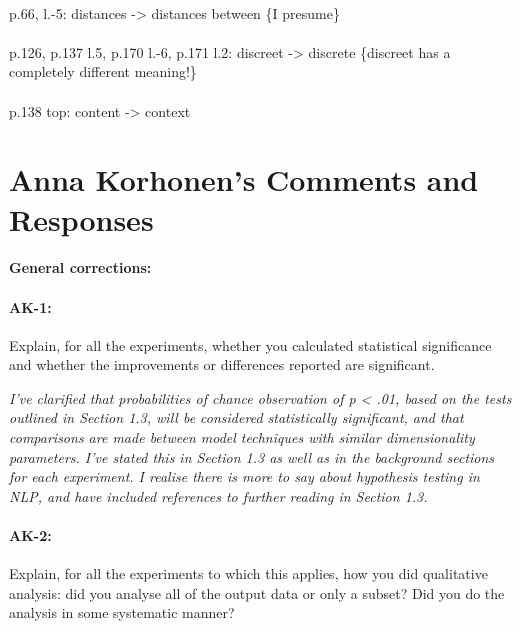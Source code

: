 \documentclass[11pt,a4paper]{article}
\newcommand{\res}[1]{\vspace{0.25cm} \begin{adjustwidth}{1cm}{}\emph{#1}\end{adjustwidth}}
\begin{document}
\paragraph{} p.66, l.-5: distances -> distances between \{I presume\}

\paragraph{} p.126,   p.137 l.5,   p.170 l.-6,   p.171 l.2: discreet -> discrete \{discreet has a completely different meaning!\}

\paragraph{} p.138 top: content -> context 


\section{Anna Korhonen's Comments and Responses}

\paragraph{General corrections:}

\paragraph{AK-1:} Explain, for all the experiments, whether you calculated statistical significance and whether the improvements or differences reported are significant.

\res{I've clarified that probabilities of chance observation of p < .01, based on the tests outlined in Section 1.3, will be considered statistically significant, and that comparisons are made between model techniques with similar dimensionality parameters.  I've stated this in Section 1.3 as well as in the background sections for each experiment.  I realise there is more to say about hypothesis testing in NLP, and have included references to further reading in Section 1.3.}

\paragraph{AK-2:} Explain, for all the experiments to which this applies, how you did qualitative analysis: did you analyse all of the output data or only a subset? Did you do the analysis in some systematic manner?
\end{document}
